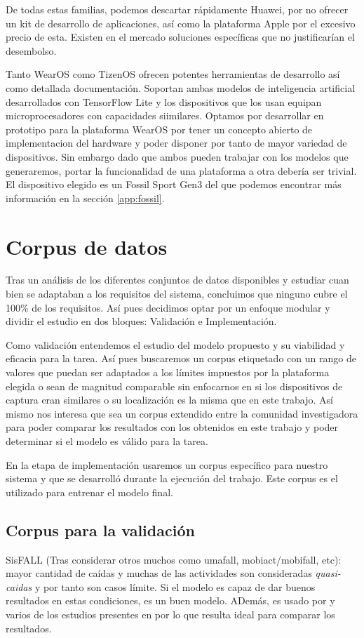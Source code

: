 \documentclass[../tfm.tex]{subfiles}
\begin{document}
De todas estas familias, podemos descartar rápidamente Huawei, por no ofrecer un kit de desarrollo de aplicaciones, así como la plataforma Apple por el excesivo precio de esta. Existen en el mercado soluciones específicas que no justificarían el desembolso.

Tanto WearOS como TizenOS ofrecen potentes herramientas de desarrollo así como detallada documentación. Soportan ambas modelos de inteligencia artificial desarrollados con TensorFlow Lite y los dispositivos que los usan equipan microprocesadores con capacidades siimilares. Optamos por desarrollar en prototipo para la plataforma WearOS por tener un concepto abierto de implementacion del hardware y poder disponer por tanto de mayor variedad de dispositivos. Sin embargo dado que ambos pueden trabajar con los modelos que generaremos, portar la funcionalidad de una plataforma a otra debería ser trivial. El dispositivo elegido es un Fossil Sport Gen3 del que podemos encontrar más información en la sección \ref{app:fossil}.


\section{Corpus de datos}\label{req_corpus}
Tras un análisis de los diferentes conjuntos de datos disponibles y estudiar cuan bien se adaptaban a los requisitos del sistema, concluimos que ninguno cubre el 100\% de los requisitos. Así pues decidimos optar por un enfoque modular y dividir el estudio en dos bloques: Validación e Implementación.

Como validación entendemos el estudio del modelo propuesto y su viabilidad y eficacia para la tarea. Así pues buscaremos un corpus etiquetado con un rango de valores que puedan ser adaptados a los límites impuestos por la plataforma elegida o sean de magnitud comparable sin enfocarnos en si los dispositivos de captura eran similares o su localización es la misma que en este trabajo. Así mismo nos interesa que sea un corpus extendido entre la comunidad investigadora para poder comparar los resultados con los obtenidos en este trabajo y poder determinar si el modelo es válido para la tarea.

En la etapa de implementación usaremos un corpus específico para nuestro sistema y que se desarrolló durante la ejecución del trabajo. Este corpus es el utilizado para entrenar el modelo final.

\subsection{Corpus para la validación}
SisFALL (Tras considerar otros muchos como umafall, mobiact/mobifall, etc): mayor cantidad de caídas y muchas de las actividades son consideradas \textit{quasi-caidas} y por tanto son casos límite. Si el modelo es capaz de dar buenos resultados en estas condiciones, es un buen modelo. ADemás, es usado por \cite{Musci2020} y varios de los estudios presentes en \cite{Anita2020} por lo que resulta ideal para comparar los resultados.
\end{document}
